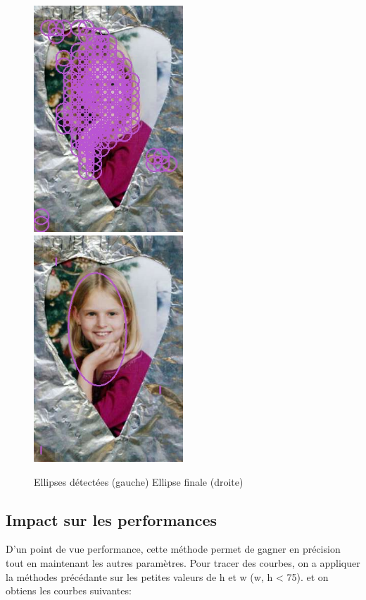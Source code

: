 \documentclass[a4paper,12pt, openany]{book}
\theoremstyle{break}
\begin{document}
 \begin{figure}[H]
   \includegraphics[width=0.5\textwidth]{images/raw_face_img_971}\hfill
   \includegraphics[width=0.5\textwidth]{images/face_img_971}\hfill
   \caption{Ellipses détectées (gauche) Ellipse finale (droite)}
   \label{fig:faces}
 \end{figure}

\subsection{Impact sur les performances}
D'un point de vue performance, cette méthode permet de gagner en précision tout en maintenant les autres paramètres. Pour tracer des courbes, on a appliquer la méthodes précédante sur les petites valeurs de h et w (w, h < 75). et on obtiens les courbes suivantes:
\end{document}
